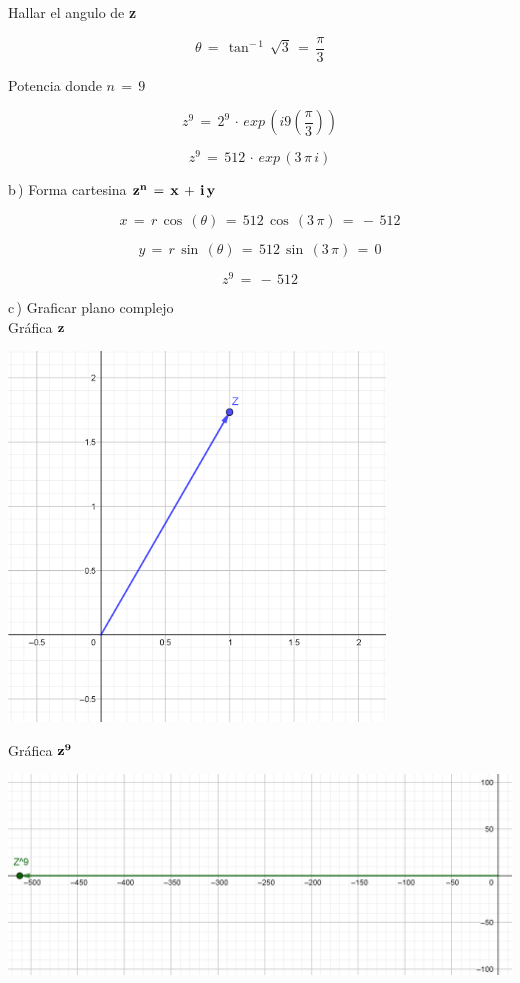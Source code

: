 \documentclass[a4paper,11pt,openany]{book}
\begin{document}
\textcolor{ao(english)}{} Hallar el angulo de \textbf{z}

$$\theta\,=\,\tan^{-\,1}\,\sqrt{3}\,=\,\dfrac{\pi}{3}$$

\textcolor{ao(english)}{} Potencia donde $n\,=\,9$

$$z^{9}\,=\,2^{9}\,\cdot\,exp\,\left(i9\left(\dfrac{\pi}{3}\right)\right)$$

$$z^{9}\,=\,512\,\cdot\,exp\,\left(3\,\pi\,i\right)$$

\textcolor{ao(english)}{b\,)} Forma cartesina $\bf{z^{n}\,=\,x\,+\,i\,y}$

$$x\,=\,r\,\cos\,(\theta)\,=\,512\,\cos\,(3\,\pi)\,=\,-\,512$$

$$y\,=\,r\,\sin\,(\theta)\,=\,512\,\sin\,(3\,\pi)\,=\,0$$

$$z^{9}\,=\,-\,512$$

\newpage

\textcolor{ao(english)}{c\,)} Graficar plano complejo\\

\textcolor{ao(english)}{} Gráfica $\bf{z}$

\begin{center}
    \includegraphics[width=10cm]{Gra-Ej-7-1.png}
\end{center}

\textcolor{ao(english)}{} Gráfica $\bf{z^{9}}$

\begin{center}
    \includegraphics[width=15cm]{Gra-Ej-7-2.png}
\end{center}
\end{document}

